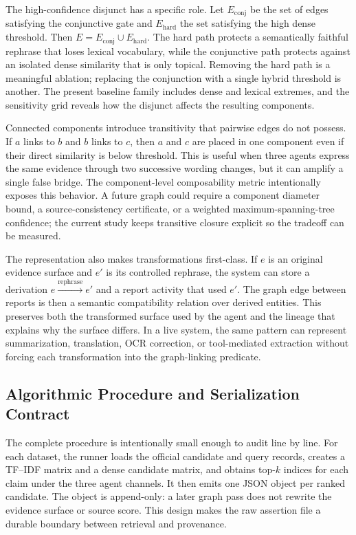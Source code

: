 \documentclass{ieeeaccess}
\begin{document}
The high-confidence disjunct has a specific role. Let $E_{\mathrm{conj}}$ be the set of edges satisfying the conjunctive gate and $E_{\mathrm{hard}}$ the set satisfying the high dense threshold. Then $E=E_{\mathrm{conj}}\cup E_{\mathrm{hard}}$. The hard path protects a semantically faithful rephrase that loses lexical vocabulary, while the conjunctive path protects against an isolated dense similarity that is only topical. Removing the hard path is a meaningful ablation; replacing the conjunction with a single hybrid threshold is another. The present baseline family includes dense and lexical extremes, and the sensitivity grid reveals how the disjunct affects the resulting components.

Connected components introduce transitivity that pairwise edges do not possess. If $a$ links to $b$ and $b$ links to $c$, then $a$ and $c$ are placed in one component even if their direct similarity is below threshold. This is useful when three agents express the same evidence through two successive wording changes, but it can amplify a single false bridge. The component-level composability metric intentionally exposes this behavior. A future graph could require a component diameter bound, a source-consistency certificate, or a weighted maximum-spanning-tree confidence; the current study keeps transitive closure explicit so the tradeoff can be measured.

The representation also makes transformations first-class. If $e$ is an original evidence surface and $e'$ is its controlled rephrase, the system can store a derivation $e\xrightarrow{\mathrm{rephrase}}e'$ and a report activity that used $e'$. The graph edge between reports is then a semantic compatibility relation over derived entities. This preserves both the transformed surface used by the agent and the lineage that explains why the surface differs. In a live system, the same pattern can represent summarization, translation, OCR correction, or tool-mediated extraction without forcing each transformation into the graph-linking predicate.

\subsection{Algorithmic Procedure and Serialization Contract}
The complete procedure is intentionally small enough to audit line by line. For each dataset, the runner loads the official candidate and query records, creates a TF--IDF matrix and a dense candidate matrix, and obtains top-$k$ indices for each claim under the three agent channels. It then emits one JSON object per ranked candidate. The object is append-only: a later graph pass does not rewrite the evidence surface or source score. This design makes the raw assertion file a durable boundary between retrieval and provenance.
\end{document}
